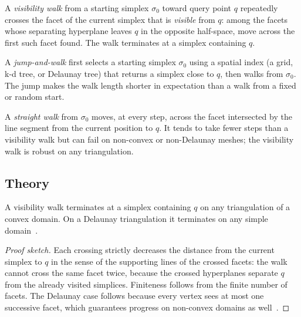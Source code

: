 \begin{definition}\label{def:visibility_walk}
A \emph{visibility walk} from a starting simplex $\sigma_0$ toward query point
$q$ repeatedly crosses the facet of the current simplex that is
\emph{visible} from $q$: among the facets whose separating hyperplane leaves
$q$ in the opposite half-space, move across the first such facet found. The
walk terminates at a simplex containing $q$.
\end{definition}

\begin{definition}\label{def:jump_and_walk}
A \emph{jump-and-walk} first selects a starting simplex $\sigma_0$ using a
spatial index (a grid, k-d tree, or Delaunay tree) that returns a simplex
close to $q$, then walks from $\sigma_0$. The jump makes the walk length
shorter in expectation than a walk from a fixed or random start.
\end{definition}

\begin{definition}\label{def:straight_walk}
A \emph{straight walk} from $\sigma_0$ moves, at every step, across the facet
intersected by the line segment from the current position to $q$. It tends to
take fewer steps than a visibility walk but can fail on non-convex or
non-Delaunay meshes; the visibility walk is robust on any triangulation.
\end{definition}

\subsection{Theory}

\begin{theorem}\label{thm:visibility_walk}
A visibility walk terminates at a simplex containing $q$ on any triangulation
of a convex domain. On a Delaunay triangulation it terminates on any simple
domain~\cite{devillers2002}.
\end{theorem}
\begin{proof}[Proof sketch]
Each crossing strictly decreases the distance from the current simplex to $q$
in the sense of the supporting lines of the crossed facets: the walk cannot
cross the same facet twice, because the crossed hyperplanes separate $q$ from
the already visited simplices. Finiteness follows from the finite number of
facets. The Delaunay case follows because every vertex sees at most one
successive facet, which guarantees progress on non-convex domains as
well~\cite{devillers2002}.
\end{proof}

